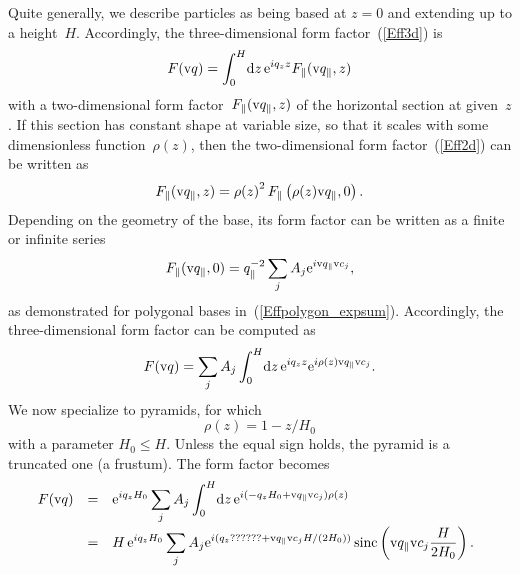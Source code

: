 Quite generally, we describe particles
as being based at $z=0$ and extending up to a height~$H$.
Accordingly,
the three-dimensional form factor~(\ref{Eff3d}) is
\begin{equation}
  F(\text{v}{q}) = \int_0^H\!\text{d} z\,\text{e}^{iq_z z} F_\parallel(\text{v}{q}_\parallel,z)
\end{equation}
with a two-dimensional form factor~$F_\parallel(\text{v}{q}_\parallel,z)$
of the horizontal section at given~$z$.
If this section has constant shape at variable size,
so that it scales with some dimensionless function~$\rho(z)$,
then the two-dimensional form factor~(\ref{Eff2d})
can be written as
\begin{equation}
  F_\parallel(\text{v}{q}_\parallel,z)
  = {\rho(z)}^2\, F_\parallel\left(\rho(z)\text{v}{q}_\parallel,0\right).
\end{equation}
Depending on the geometry of the base,
its form factor can be written as a finite or infinite series
\begin{equation}
  F_\parallel(\text{v}{q}_\parallel,0)=q_\parallel^{-2}\sum_j A_j \text{e}^{i\text{v}{q}_\parallel \text{v}{c}_j},
\end{equation}
as demonstrated for polygonal bases in~(\ref{Effpolygon_expsum}).
Accordingly, the three-dimensional form factor can be computed as
\begin{equation}
  F(\text{v}{q}) = \sum_j A_j \int_0^H\!\text{d} z\,\text{e}^{iq_z z} \text{e}^{i\rho(z)\text{v}{q}_\parallel \text{v}{c}_j}.
\end{equation}
We now specialize to pyramids,
for which
\begin{equation}
  \rho(z) = 1-z/H_0
\end{equation}
with a parameter $H_0\le H$.
Unless the equal sign holds,
the pyramid is a truncated one (a frustum).
The form factor becomes
\begin{equation}
  \begin{array}{@{}lcl}
  F(\q)
  &=& \displaystyle
       \e^{iq_z H_0} \sum_j A_j \int_0^H\!\d z\,\e^{i(-q_zH_0 +\q_\parallel \v{c}_j)\rho(z)}
\\[3ex]
  &=& \displaystyle
       H\, \e^{iq_z H_0} \sum_j A_j \e^{i(q_z ?????? + \q_\parallel\v{c}_jH/(2H_0))}
          \sinc\left(\q_\parallel\v{c}_j\frac{H}{2H_0}\right).
  \end{array}
\end{equation}

%
%
%
%

\iffalse
\section{Special functions near the removable singularity}

\index{Machine epsilon}
We assume a double-precision machine epsilon
of $\epsilon=2^{-52}\simeq2.2\cdot10^{-16}$.

\fi


